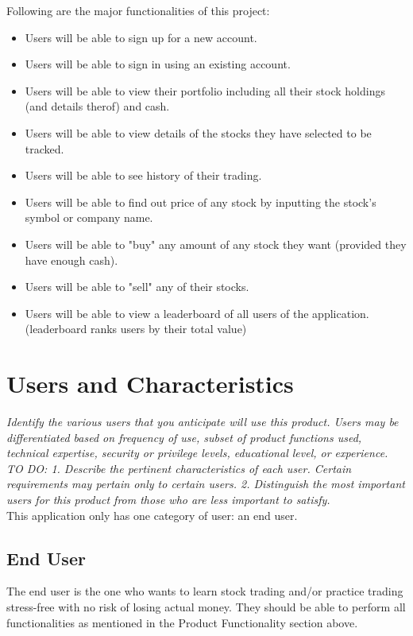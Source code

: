 \documentclass[12 pt, a4paper]{report}
\begin{document}
	Following are the major functionalities of this project:
	\begin{itemize}
		\item Users will be able to sign up for a new account.
		\item Users will be able to sign in using an existing account.
		\item Users will be able to view their portfolio including all their stock holdings (and details therof) and cash.
		\item Users will be able to view details of the stocks they have selected to be tracked.
		\item Users will be able to see history of their trading.
		\item Users will be able to find out price of any stock by inputting the stock's symbol or company name.
		\item Users will be able to "buy" any amount of any stock they want (provided they have enough cash).
		\item Users will be able to "sell" any of their stocks.
		\item Users will be able to view a leaderboard of all users of the application. (leaderboard ranks users by their total value)
	\end{itemize}
	
	\section {Users and Characteristics}
	\textit{Identify the various users that you anticipate will use this product. Users may be differentiated based on frequency of use, subset of product functions used, technical expertise, security or privilege levels, educational level, or experience.}
	\textit{	TO DO: 
		1. Describe the pertinent characteristics of each user. Certain requirements may pertain only to certain users. 
		2. Distinguish the most important users for this product from those who are less important to satisfy.
	}\\
	This application only has one category of user: an end user.
	
	\subsection{End User}
	The end user is the one who wants to learn stock trading and/or practice trading stress-free with no risk of losing actual money. They should be able to perform all functionalities as mentioned in the Product Functionality section above.
	
\end{document}
